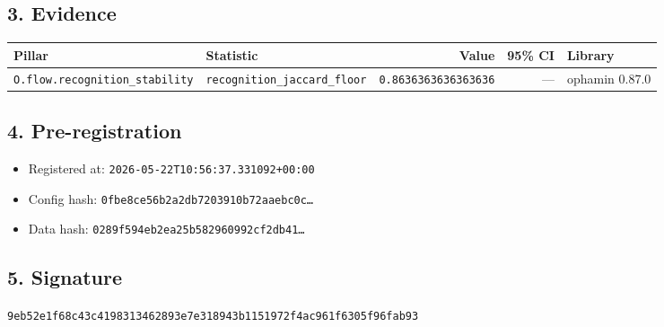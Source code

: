 \documentclass{article}
\begin{document}
\subsection*{3. Evidence}
\begin{tabular}{llrrl}\toprule
\textbf{Pillar} & \textbf{Statistic} & \textbf{Value} & \textbf{95\% CI} & \textbf{Library} \\\midrule
\texttt{O.flow.recognition\_stability} & \texttt{recognition\_jaccard\_floor} & \texttt{0.8636363636363636} & --- & ophamin 0.87.0 \\
\bottomrule\end{tabular}
\subsection*{4. Pre-registration}
\begin{itemize}
\item Registered at: \texttt{2026-05-22T10:56:37.331092+00:00}
\item Config hash: \texttt{0fbe8ce56b2a2db7203910b72aaebc0c\dots}
\item Data hash: \texttt{0289f594eb2ea25b582960992cf2db41\dots}
\end{itemize}
\subsection*{5. Signature}
\texttt{9eb52e1f68c43c4198313462893e7e318943b1151972f4ac961f6305f96fab93}\\
\end{document}
